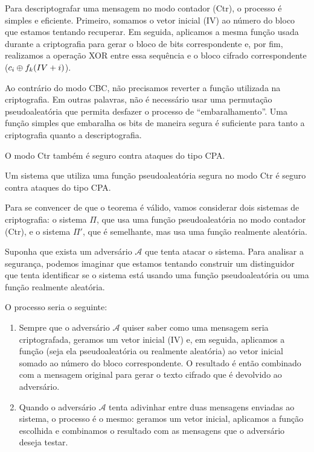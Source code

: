 Para descriptografar uma mensagem no modo contador (Ctr), o processo é simples e eficiente.
Primeiro, somamos o vetor inicial (IV) ao número do bloco que estamos tentando recuperar.
Em seguida, aplicamos a mesma função usada durante a criptografia para gerar o bloco de bits correspondente e, por fim, realizamos a operação XOR entre essa sequência e o bloco cifrado correspondente ($c_i \oplus f_k(IV + i)$).

Ao contrário do modo CBC, não precisamos reverter a função utilizada na criptografia.
Em outras palavras, não é necessário usar uma permutação pseudoaleatória que permita desfazer o processo de ``embaralhamento''.
Uma função simples que embaralha os bits de maneira segura é suficiente para tanto a criptografia quanto a descriptografia.

O modo Ctr também é seguro contra ataques do tipo CPA.

\begin{theorem}
Um sistema que utiliza uma função pseudoaleatória segura no modo Ctr é seguro contra ataques do tipo CPA.
\end{theorem}

Para se convencer de que o teorema é válido, vamos considerar dois sistemas de criptografia:
o sistema $\Pi$, que usa uma função pseudoaleatória no modo contador (Ctr), e o sistema $\Pi'$, que é semelhante, mas usa uma função realmente aleatória.

Suponha que exista um adversário $\mathcal{A}$ que tenta atacar o sistema.
Para analisar a segurança, podemos imaginar que estamos tentando construir um distinguidor que tenta identificar se o sistema está usando uma função pseudoaleatória ou uma função realmente aleatória.

O processo seria o seguinte:

\begin{enumerate}
\item Sempre que o adversário $\mathcal{A}$ quiser saber como uma mensagem seria criptografada, geramos um vetor inicial (IV) e, em seguida, aplicamos a função (seja ela pseudoaleatória ou realmente aleatória) ao vetor inicial somado ao número do bloco correspondente.
  O resultado é então combinado com a mensagem original para gerar o texto cifrado que é devolvido ao adversário.
\item Quando o adversário $\mathcal{A}$ tenta adivinhar entre duas mensagens enviadas ao sistema, o processo é o mesmo:
  geramos um vetor inicial, aplicamos a função escolhida e combinamos o resultado com as mensagens que o adversário deseja testar.
\end{enumerate}

